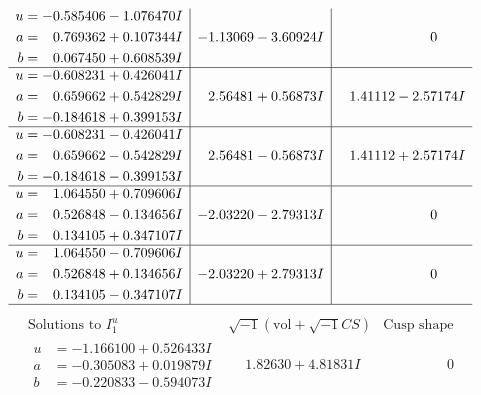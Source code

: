 \documentclass[1p]{elsarticle_modified}
\theoremstyle{definition}
\newcommand{\I}{\sqrt{-1}}
\begin{document}
$$\begin{array}{c|c|c}
\begin{aligned}
u &= -0.585406 - 1.076470 I \\
a &= \phantom{-}0.769362 + 0.107344 I \\
b &= \phantom{-}0.067450 + 0.608539 I\end{aligned}
 & -1.13069 - 3.60924 I & \phantom{-0.000000 } 0 \\ \hline\begin{aligned}
u &= -0.608231 + 0.426041 I \\
a &= \phantom{-}0.659662 + 0.542829 I \\
b &= -0.184618 + 0.399153 I\end{aligned}
 & \phantom{-}2.56481 + 0.56873 I & \phantom{-}1.41112 - 2.57174 I \\ \hline\begin{aligned}
u &= -0.608231 - 0.426041 I \\
a &= \phantom{-}0.659662 - 0.542829 I \\
b &= -0.184618 - 0.399153 I\end{aligned}
 & \phantom{-}2.56481 - 0.56873 I & \phantom{-}1.41112 + 2.57174 I \\ \hline\begin{aligned}
u &= \phantom{-}1.064550 + 0.709606 I \\
a &= \phantom{-}0.526848 - 0.134656 I \\
b &= \phantom{-}0.134105 + 0.347107 I\end{aligned}
 & -2.03220 - 2.79313 I & \phantom{-0.000000 } 0 \\ \hline\begin{aligned}
u &= \phantom{-}1.064550 - 0.709606 I \\
a &= \phantom{-}0.526848 + 0.134656 I \\
b &= \phantom{-}0.134105 - 0.347107 I\end{aligned}
 & -2.03220 + 2.79313 I & \phantom{-0.000000 } 0\\
 \hline 
 \end{array}$$\newpage$$\begin{array}{c|c|c}  
\text{Solutions to }I^u_{1}& \I (\text{vol} + \sqrt{-1}CS) & \text{Cusp shape}\\
 \hline 
\begin{aligned}
u &= -1.166100 + 0.526433 I \\
a &= -0.305083 + 0.019879 I \\
b &= -0.220833 - 0.594073 I\end{aligned}
 & \phantom{-}1.82630 + 4.81831 I & \phantom{-0.000000 } 0 \\ \hline\begin{aligned}

\end{aligned}
\end{array}$$
\end{document}
